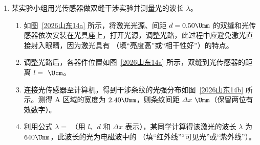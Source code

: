 \documentclass[\gkver]{gaokaozhenti}
\begin{document}
\begin{enumerate}
{（2）只有当物块匀速运动时，细线上拉力 $F$ 才与物块受到的滑动摩擦力大小相等，因此需要选用物块匀速运动阶段的数据，即题图乙中时间段 $4.0 \sim 6.0\Us$ 内的数据。

（3）根据题图乙可知，物块受到的滑动摩擦力 $f = F = 1.10\UN$

根据 $f = \mu F_{N}$，结合 $F_{N} = mg$，解得 $\mu = \frac{F}{mg} \approx 0.56$

（4）若桌面右端略高于左端，橡胶板形成一个左低右高的斜面。物块初始放在右端，被小车向左缓慢拉动，属于沿斜面向下运动。此时物块受到重力沿斜面向下的分力 $mg\sin\theta$ 与拉力 $F'$ 同向，共同克服滑动摩擦力 $\mu mg\cos\theta$，即 $F' + mg\sin\theta = \mu mg\cos\theta$

得 $F' = \mu mg\cos\theta - mg\sin\theta$

若仍按水平面的公式 $\mu_{\text{测}} = \frac{F'}{mg}$ 计算，则 $\mu_{\text{测}} = \mu\cos\theta - \sin\theta$

由于倾角 $\theta > 0$，$\cos\theta < 1$，$\sin\theta > 0$，故 $\mu_{\text{测}} < \mu$，即测量值偏小。
}

\item
某实验小组用光传感器做双缝干涉实验并测量光的波长 $\lambda$。
\begin{enumerate}
	\item
	如图~\ref{2026山东14a} 所示，将激光光源、间距 $d = 0.50\Umm$ 的双缝和光传感器依次安装在光具座上，打开光源，调整光路，此过程中应避免激光直接射入眼睛，因为激光具有 （填“亮度高”或“相干性好”）的特点。
	\item
	调整光路后，各器件位置如图~\ref{2026山东14a} 所示，双缝到光传感器的距离 $l =$  $\Ucm$。
	\item
	连接光传感器至计算机，得到干涉条纹的光强分布如图~\ref{2026山东14b} 所示。测得 A 区域的宽度为 $2.40\Umm$，则条纹间距 $\Delta x$  $\Umm$（保留两位有效数字）。
	\item
	利用公式 $\lambda =$ （用 $l$、$d$ 和 $\Delta x$ 表示），某同学计算得该激光的波长 $\lambda$ 为 $640\Unm$，此波长的光为电磁波中的 （填“红外线”“可见光”或“紫外线”）。
\end{enumerate}
\end{enumerate}
\end{document}
